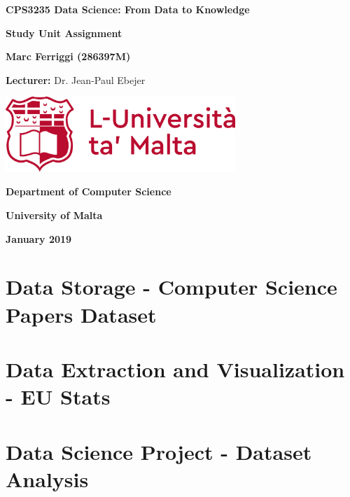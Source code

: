 \documentclass[12pt]{report}
\begin{document}
	\begin{titlepage}
		\centering
		{\LARGE\bfseries CPS3235 Data Science: From Data to Knowledge\par}
		\vspace{.5cm}
		
		{\Large \textbf{Study Unit Assignment} \par}
		\vspace{.5cm}
		
		{\large \textbf{Marc Ferriggi (286397M)}\par}
		\vspace{0.5cm}
		
		{\large \textbf{Lecturer:} Dr. Jean-Paul Ebejer\par}
		\vfill
		
		\includegraphics[width=0.65\textwidth]{UoMLogo}\par
		\vfill
		
		{\large\bfseries Department of Computer Science \par}
		{\large\bfseries University of Malta \par}
		{\large\bfseries January 2019 \par}
	\end{titlepage}
	
	\tableofcontents
	\vfill
	\cleardoublepage
	
	\section{Data Storage - Computer Science Papers Dataset}
	\pagebreak
	
	\section{Data Extraction and Visualization - EU Stats}
	\pagebreak
	
	\section{Data Science Project - Dataset Analysis}

	
	\pagebreak
\end{document}
